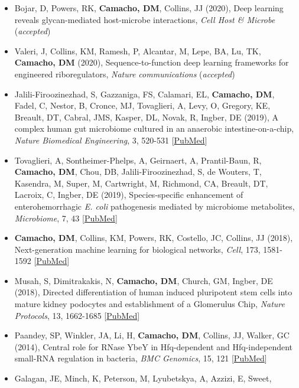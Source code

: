 \documentclass[11pt,a4paper,]{awesome-cv}
\providecommand{\tightlist}{%
	\setlength{\itemsep}{0pt}\setlength{\parskip}{0pt}}
\begin{document}
\begin{itemize}
\tightlist
\item
  Bojar, D, Powers, RK, \textbf{Camacho, DM}, Collins, JJ (2020), Deep
  learning reveals glycan-mediated host-microbe interactions, \emph{Cell
  Host \& Microbe} (\emph{accepted})
\item
  Valeri, J, Collins, KM, Ramesh, P, Alcantar, M, Lepe, BA, Lu, TK,
  \textbf{Camacho, DM} (2020), Sequence-to-function deep learning
  frameworks for engineered riboregulators, \emph{Nature communications}
  (\emph{accepted})
\item
  Jalili-Firoozinezhad, S, Gazzaniga, FS, Calamari, EL, \textbf{Camacho,
  DM}, Fadel, C, Nestor, B, Cronce, MJ, Tovaglieri, A, Levy, O, Gregory,
  KE, Breault, DT, Cabral, JMS, Kasper, DL, Novak, R, Ingber, DE (2019),
  A complex human gut microbiome cultured in an anaerobic
  intestine-on-a-chip, \emph{Nature Biomedical Engineering}, 3, 520-531
  {[}\href{https://www.ncbi.nlm.nih.gov/pubmed/31086325}{PubMed}{]}
\item
  Tovaglieri, A, Sontheimer-Phelps, A, Geirnaert, A, Prantil-Baun, R,
  \textbf{Camacho, DM}, Chou, DB, Jalili-Firoozinezhad, S, de Wouters,
  T, Kasendra, M, Super, M, Cartwright, M, Richmond, CA, Breault, DT,
  Lacroix, C, Ingber, DE (2019), Species-specific enhancement of
  enterohemorrhagic \emph{E. coli} pathogenesis mediated by microbiome
  metabolites, \emph{Microbiome}, 7, 43
  {[}\href{https://www.ncbi.nlm.nih.gov/pubmed/30890187}{PubMed}{]}
\item
  \textbf{Camacho, DM}, Collins, KM, Powers, RK, Costello, JC, Collins,
  JJ (2018), Next-generation machine learning for biological networks,
  \emph{Cell}, 173, 1581-1592
  {[}\href{https://www.ncbi.nlm.nih.gov/pubmed/29887378}{PubMed}{]}
\item
  Musah, S, Dimitrakakis, N, \textbf{Camacho, DM}, Church, GM, Ingber,
  DE (2018), Directed differentiation of human induced pluripotent stem
  cells into mature kidney podocytes and establishment of a Glomerulus
  Chip, \emph{Nature Protocols}, 13, 1662-1685
  {[}\href{https://www.ncbi.nlm.nih.gov/pubmed/29995874}{PubMed}{]}
\item
  Paandey, SP, Winkler, JA, Li, H, \textbf{Camacho, DM}, Collins, JJ,
  Walker, GC (2014), Central role for RNase YbeY in Hfq-dependent and
  Hfq-independent small-RNA regulation in bacteria, \emph{BMC Genomics},
  15, 121
  {[}\href{https://www.ncbi.nlm.nih.gov/pubmed/24511998}{PubMed}{]}
\item
  Galagan, JE, Minch, K, Peterson, M, Lyubetskya, A, Azzizi, E, Sweet,

\end{itemize}
\end{document}
